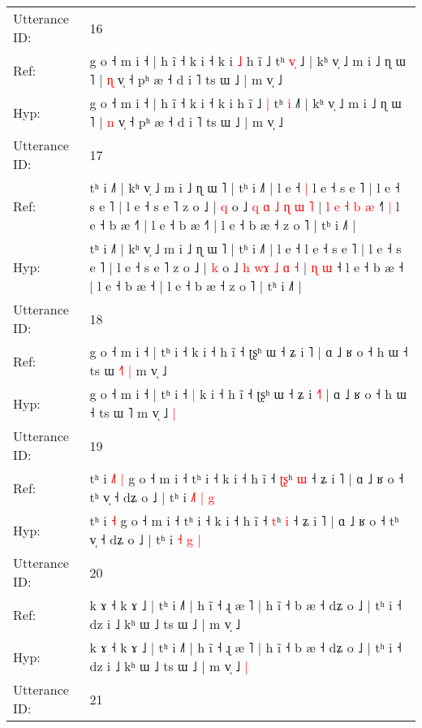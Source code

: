 \documentclass[10pt]{article}
\DeclareRobustCommand{\hl}[1]{{\textcolor{red}{#1}}}
\begin{document}
\begin{longtable}{ll}
 \\
\midrule
Utterance ID: & 16 \\
Ref: & g o ˧ m i ˧ | h ĩ ˧ k i ˧ k i\hl{ }\hl{˩} h ĩ ˩\hl{}\hl{} tʰ \hl{v}\hl{̩} ˩\hl{} | kʰ v̩ ˩ m i ˩ ɳ ɯ ˥ | \hl{ɳ} v̩ ˧ pʰ æ ˧ d i ˥ ts ɯ ˩ | m v̩ ˩
 \\
Hyp: & g o ˧ m i ˧ | h ĩ ˧ k i ˧ k i\hl{}\hl{} h ĩ ˩\hl{ }\hl{|} tʰ \hl{}\hl{i} ˩\hl{˥} | kʰ v̩ ˩ m i ˩ ɳ ɯ ˥ | \hl{n} v̩ ˧ pʰ æ ˧ d i ˥ ts ɯ ˩ | m v̩ ˩
 \\
\midrule
Utterance ID: & 17 \\
Ref: & tʰ i ˩˥ | kʰ v̩ ˩ m i ˩ ɳ ɯ ˥ | tʰ i ˩˥ | l e ˧\hl{ }\hl{|} l e ˧ s e ˥ | l e ˧ s e ˥ | l e ˧ s e ˥ z o ˩ | \hl{q} o ˩ \hl{q} \hl{ɑ}\hl{ }\hl{˩} \hl{ɳ} \hl{ɯ} \hl{˥} |\hl{ }\hl{l}\hl{ }\hl{e}\hl{ }\hl{˧} \hl{b} \hl{æ} ˧\hl{˥}\hl{ }\hl{|} l e ˧ b æ ˧\hl{˥} | l e ˧ b æ ˧\hl{˥} | l e ˧ b æ ˧ z o ˥ | tʰ i ˩˥ |
 \\
Hyp: & tʰ i ˩˥ | kʰ v̩ ˩ m i ˩ ɳ ɯ ˥ | tʰ i ˩˥ | l e ˧\hl{}\hl{} l e ˧ s e ˥ | l e ˧ s e ˥ | l e ˧ s e ˥ z o ˩ | \hl{k} o ˩ \hl{h} \hl{}\hl{w}\hl{ɤ} \hl{˩} \hl{ɑ} \hl{˧} |\hl{}\hl{}\hl{}\hl{}\hl{}\hl{} \hl{ɳ} \hl{ɯ} ˧\hl{}\hl{}\hl{} l e ˧ b æ ˧\hl{} | l e ˧ b æ ˧\hl{} | l e ˧ b æ ˧ z o ˥ | tʰ i ˩˥ |
 \\
\midrule
Utterance ID: & 18 \\
Ref: & g o ˧ m i ˧ | tʰ i ˧\hl{}\hl{} k i ˧ h ĩ ˧ ʈʂʰ ɯ ˧ ʑ i \hl{}˥ | ɑ ˩ ʁ o ˧ h ɯ ˧ ts ɯ \hl{˧}˥\hl{ }\hl{|} m v̩ ˩\hl{}\hl{}
 \\
Hyp: & g o ˧ m i ˧ | tʰ i ˧\hl{ }\hl{|} k i ˧ h ĩ ˧ ʈʂʰ ɯ ˧ ʑ i \hl{˧}˥ | ɑ ˩ ʁ o ˧ h ɯ ˧ ts ɯ \hl{}˥\hl{}\hl{} m v̩ ˩\hl{ }\hl{|}
 \\
\midrule
Utterance ID: & 19 \\
Ref: & tʰ i\hl{ }\hl{˩}\hl{˥} \hl{|} g o ˧ m i ˧ tʰ i ˧ k i ˧ h ĩ ˧ \hl{ʈ}\hl{ʂ}ʰ \hl{ɯ} ˧ ʑ i ˥ | ɑ ˩ ʁ o ˧ tʰ v̩ ˧ dʑ o ˩ | tʰ i \hl{˩}\hl{˥} \hl{|} \hl{g}
 \\
Hyp: & tʰ i\hl{}\hl{}\hl{} \hl{˧} g o ˧ m i ˧ tʰ i ˧ k i ˧ h ĩ ˧ \hl{}\hl{t}ʰ \hl{i} ˧ ʑ i ˥ | ɑ ˩ ʁ o ˧ tʰ v̩ ˧ dʑ o ˩ | tʰ i \hl{}\hl{˧} \hl{g} \hl{|}
 \\
\midrule
Utterance ID: & 20 \\
Ref: & k ɤ ˧ k ɤ ˩ | tʰ i ˩˥ | h ĩ ˧ ɻ æ ˥ | h ĩ ˧ b æ ˧ dʑ o ˩ | tʰ i ˧ dz i ˩ kʰ ɯ ˩ ts ɯ ˩ | m v̩ ˩\hl{}\hl{}
 \\
Hyp: & k ɤ ˧ k ɤ ˩ | tʰ i ˩˥ | h ĩ ˧ ɻ æ ˥ | h ĩ ˧ b æ ˧ dʑ o ˩ | tʰ i ˧ dz i ˩ kʰ ɯ ˩ ts ɯ ˩ | m v̩ ˩\hl{ }\hl{|}
 \\
\midrule
Utterance ID: & 21 \\

\end{longtable}
\end{document}
